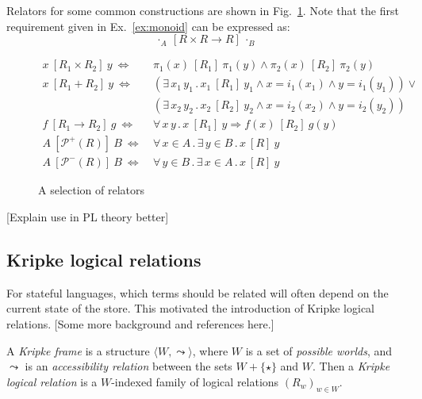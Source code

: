 \documentclass[acmsmall,anonymous]{acmart}
\newcommand{\ifr}[1]{\ [{#1}]\ }
\begin{document}
Relators for some common constructions are shown in Fig.~\ref{fig:relators}.
Note that the first requirement given in Ex.~\ref{ex:monoid}
can be expressed as:
\[
  \cdot_A \ifr{R \times R \rightarrow R} \cdot_B
\]

\begin{figure}
  \begin{align*}
    x \ifr{R_1 \times R_2} y \ \Leftrightarrow\  &
      \pi_1(x) \ifr{R_1} \pi_1(y) \wedge
      \pi_2(x) \ifr{R_2} \pi_2(y) \\
    x \ifr{R_1 + R_2} y \ \Leftrightarrow\  &
      (\exists \, x_1 \, y_1 \,.\,
        x_1 \ifr{R_1} y_1 \wedge
        x = i_1(x_1) \wedge
        y = i_1(y_1)) \vee \\ &
      (\exists \, x_2 \, y_2 \,.\,
        x_2 \ifr{R_2} y_2 \wedge
        x = i_2(x_2) \wedge
        y = i_2(y_2)) \\
    f \ifr{R_1 \rightarrow R_2} g \ \Leftrightarrow\  &
      \forall \, x \, y \,.\,
        x \ifr{R_1} y \Rightarrow
        f(x) \ifr{R_2} g(y) \\
    A \ifr{\mathcal{P}^+(R)} B \ \Leftrightarrow\  &
      \forall \, x \in A \,.\,
      \exists \, y \in B \,.\,
      x \ifr{R} y \\
    A \ifr{\mathcal{P}^-(R)} B \ \Leftrightarrow\  &
      \forall \, y \in B \,.\,
      \exists \, x \in A \,.\,
      x \ifr{R} y
  \end{align*}
  \caption{A selection of relators}
  \label{fig:relators}
\end{figure}

[Explain use in PL theory better]


\subsection{Kripke logical relations} %

For stateful languages,
which terms should be related
will often depend on the current state of the store.
This motivated the introduction of Kripke logical relations.
[Some more background and references here.]

\begin{definition}
A \emph{Kripke frame} is a structure $\langle W, \leadsto \rangle$, where
$W$ is a set of \emph{possible worlds}, and
$\leadsto$ is an \emph{accessibility relation}
between the sets $W + \{\star\}$ and $W$.
Then a \emph{Kripke logical relation} is
a $W$-indexed family of logical relations $(R_w)_{w \in W}$.
\end{definition}
\end{document}
